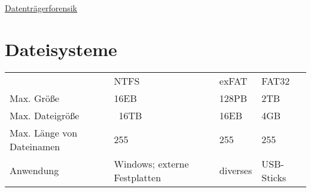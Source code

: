 \raggedright
\footnotesize
\begin{multicols}{3}	
	\setlength{\premulticols}{1pt}
	\setlength{\postmulticols}{1pt}
	\setlength{\multicolsep}{1pt}
	\setlength{\columnsep}{2pt}

\begin{center}
     \Large{\underline{Datenträgerforensik}} \\
\end{center}

\section{Dateisysteme}
\begin{tabular}{llll}
 & NTFS & exFAT & FAT32 \\
Max. Größe & 16EB & 128PB & 2TB\\
Max. Dateigröße & ~16TB & 16EB & 4GB\\
Max. Länge von Dateinamen & 255 & 255 & 255\\
Anwendung & Windows; externe Festplatten & diverses & USB-Sticks\\
 \end{tabular}

\end{multicols}
